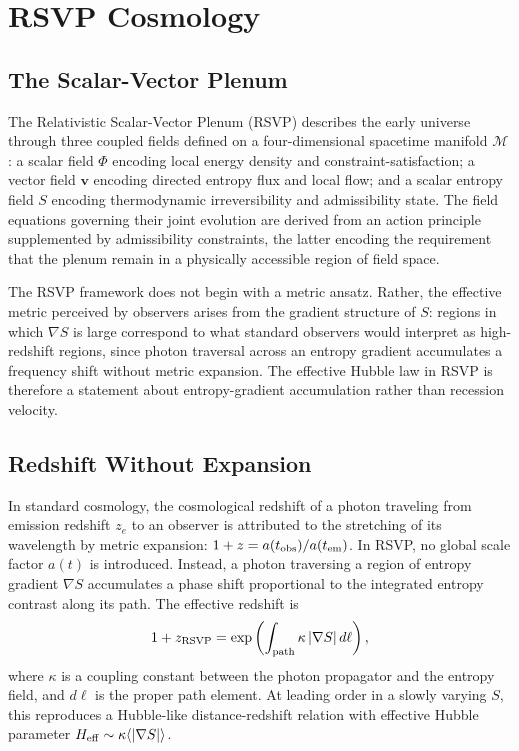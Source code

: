 \documentclass[12pt, a4paper]{article}
\newcommand{\vv}{\mathbf{v}}
\newcommand{\Heff}{H_{\rm eff}}
\begin{document}
\section{RSVP Cosmology}
\label{sec:rsvp}

\subsection{The Scalar-Vector Plenum}

The Relativistic Scalar-Vector Plenum (RSVP) describes the early universe through
three coupled fields defined on a four-dimensional spacetime manifold $\mathcal{M}$:
a scalar field $\Phi$ encoding local energy density and constraint-satisfaction; a
vector field $\vv$ encoding directed entropy flux and local flow; and a scalar
entropy field $S$ encoding thermodynamic irreversibility and admissibility state.
The field equations governing their joint evolution are derived from an action
principle supplemented by admissibility constraints, the latter encoding the
requirement that the plenum remain in a physically accessible region of field space.

The RSVP framework does not begin with a metric ansatz. Rather, the effective
metric perceived by observers arises from the gradient structure of $S$: regions
in which $\nabla S$ is large correspond to what standard observers would interpret
as high-redshift regions, since photon traversal across an entropy gradient
accumulates a frequency shift without metric expansion. The effective Hubble law in
RSVP is therefore a statement about entropy-gradient accumulation rather than
recession velocity.

\subsection{Redshift Without Expansion}

In standard cosmology, the cosmological redshift of a photon traveling from emission
redshift $z_e$ to an observer is attributed to the stretching of its wavelength by
metric expansion: $1 + z = a(t_{\rm obs})/a(t_{\rm em})$. In RSVP, no global scale
factor $a(t)$ is introduced. Instead, a photon traversing a region of entropy
gradient $\nabla S$ accumulates a phase shift proportional to the integrated entropy
contrast along its path. The effective redshift is
\begin{equation}
1 + z_{\rm RSVP} = \exp\left(\int_{\rm path} \kappa\,|\nabla S|\,d\ell\right),
\end{equation}
where $\kappa$ is a coupling constant between the photon propagator and the entropy
field, and $d\ell$ is the proper path element. At leading order in a slowly varying
$S$, this reproduces a Hubble-like distance-redshift relation with effective Hubble
parameter $\Heff \sim \kappa\langle|\nabla S|\rangle$.
\end{document}
